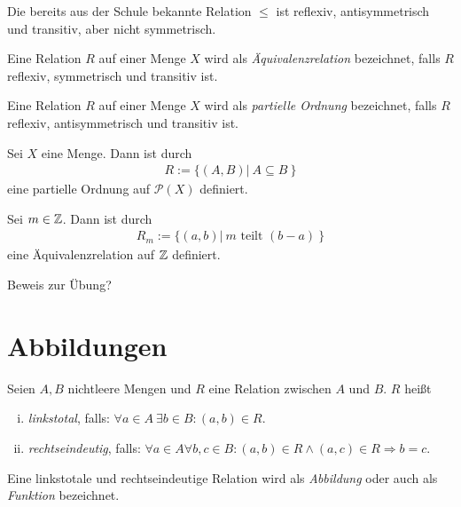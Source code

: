 \begin{example}
    Die bereits aus der Schule bekannte Relation $\leq$ ist reflexiv, antisymmetrisch und transitiv, aber nicht symmetrisch. 
\end{example}

\begin{mydef}
    Eine Relation $R$ auf einer Menge $X$ wird als \textit{Äquivalenzrelation} bezeichnet, falls $R$ reflexiv, symmetrisch und transitiv ist. 
\end{mydef}

\begin{mydef}
    Eine Relation $R$ auf einer Menge $X$ wird als \textit{partielle Ordnung} bezeichnet, falls $R$ reflexiv, antisymmetrisch und transitiv ist. 
\end{mydef}

\begin{proposition}
    Sei $X$ eine Menge. Dann ist durch 
    \begin{align*}
        R := \{ (A,B) | \  A \subseteq B \ \}
    \end{align*}
    eine partielle Ordnung auf $\mathcal{P}(X)$ definiert. 
\end{proposition}



\begin{proposition}
    Sei $m \in \mathbb{Z}$. Dann ist durch 
    \begin{align*}
        R_m := \{(a,b) | \ m \text{ teilt } (b-a) \ \}
    \end{align*}
    eine Äquivalenzrelation auf $\mathbb{Z}$ definiert. 
\end{proposition}

Beweis zur Übung? 

\section{Abbildungen}

\begin{mydef}
    Seien $A,B$  nichtleere Mengen und $R$ eine Relation zwischen $A$ und $B$. $R$ heißt 
    \begin{enumerate}[(i)]
        \item 
        \textit{linkstotal}, falls: $\forall a \in A \ \exists b \in B : (a,b) \in R$. 
        \item
        \textit{rechtseindeutig}, falls: $\forall a \in A \forall b,c \in B: (a,b) \in R \wedge (a,c) \in R \Rightarrow b = c $. 
    \end{enumerate}
    Eine linkstotale und rechtseindeutige Relation wird als \textit{Abbildung} oder auch als \textit{Funktion} bezeichnet. 
\end{mydef}

